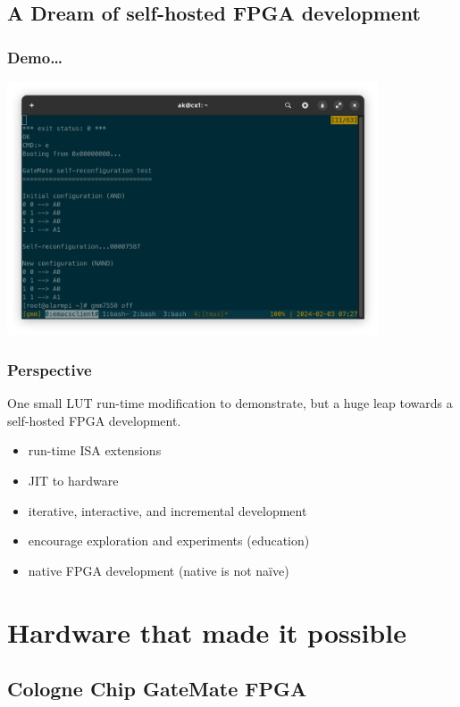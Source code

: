 
\subsection{A Dream of self-hosted FPGA development}

\begin{frame}[t]
\frametitle{Demo\dots}
\vspace{-1cm}
\begin{center}
\includegraphics[width=11cm]{screenshot.png}
\end{center}
\end{frame}

\begin{frame}
\frametitle{Perspective}
One small LUT run-time modification to demonstrate, but a huge leap
towards a self-hosted FPGA development.
\begin{itemize}
\item run-time ISA extensions
\item JIT to hardware
\item iterative, interactive, and incremental development
\item encourage exploration and experiments (education)
\item native FPGA development (native is not na\"ive)
\end{itemize}
\end{frame}

\section{Hardware that made it possible}

\subsection{Cologne Chip GateMate FPGA}

